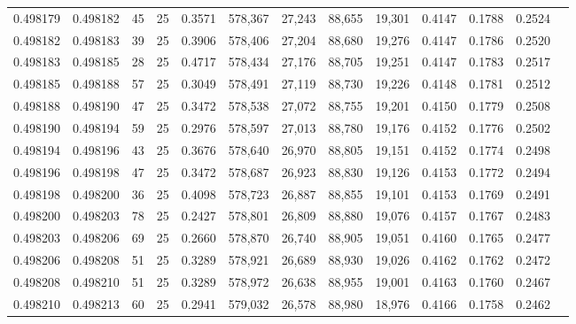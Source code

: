 \begin{tabular}{rrrrrrrrrrrrr}
0.498179 & 0.498182 &    45 &  25 &                                     0.3571 & 578,367 &  27,243 &  88,655 &  19,301 & 0.4147 & 0.1788 & 0.2524 \\
0.498182 & 0.498183 &    39 &  25 &                                     0.3906 & 578,406 &  27,204 &  88,680 &  19,276 & 0.4147 & 0.1786 & 0.2520 \\
0.498183 & 0.498185 &    28 &  25 &                                     0.4717 & 578,434 &  27,176 &  88,705 &  19,251 & 0.4147 & 0.1783 & 0.2517 \\
0.498185 & 0.498188 &    57 &  25 &                                     0.3049 & 578,491 &  27,119 &  88,730 &  19,226 & 0.4148 & 0.1781 & 0.2512 \\
0.498188 & 0.498190 &    47 &  25 &                                     0.3472 & 578,538 &  27,072 &  88,755 &  19,201 & 0.4150 & 0.1779 & 0.2508 \\
0.498190 & 0.498194 &    59 &  25 &                                     0.2976 & 578,597 &  27,013 &  88,780 &  19,176 & 0.4152 & 0.1776 & 0.2502 \\
0.498194 & 0.498196 &    43 &  25 &                                     0.3676 & 578,640 &  26,970 &  88,805 &  19,151 & 0.4152 & 0.1774 & 0.2498 \\
0.498196 & 0.498198 &    47 &  25 &                                     0.3472 & 578,687 &  26,923 &  88,830 &  19,126 & 0.4153 & 0.1772 & 0.2494 \\
0.498198 & 0.498200 &    36 &  25 &                                     0.4098 & 578,723 &  26,887 &  88,855 &  19,101 & 0.4153 & 0.1769 & 0.2491 \\
0.498200 & 0.498203 &    78 &  25 &                                     0.2427 & 578,801 &  26,809 &  88,880 &  19,076 & 0.4157 & 0.1767 & 0.2483 \\
0.498203 & 0.498206 &    69 &  25 &                                     0.2660 & 578,870 &  26,740 &  88,905 &  19,051 & 0.4160 & 0.1765 & 0.2477 \\
0.498206 & 0.498208 &    51 &  25 &                                     0.3289 & 578,921 &  26,689 &  88,930 &  19,026 & 0.4162 & 0.1762 & 0.2472 \\
0.498208 & 0.498210 &    51 &  25 &                                     0.3289 & 578,972 &  26,638 &  88,955 &  19,001 & 0.4163 & 0.1760 & 0.2467 \\
0.498210 & 0.498213 &    60 &  25 &                                     0.2941 & 579,032 &  26,578 &  88,980 &  18,976 & 0.4166 & 0.1758 & 0.2462 \\

\end{tabular}
